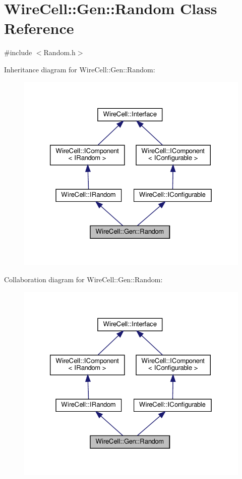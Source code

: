 \hypertarget{class_wire_cell_1_1_gen_1_1_random}{}\section{Wire\+Cell\+:\+:Gen\+:\+:Random Class Reference}
\label{class_wire_cell_1_1_gen_1_1_random}


{\ttfamily \#include $<$Random.\+h$>$}



Inheritance diagram for Wire\+Cell\+:\+:Gen\+:\+:Random\+:
\nopagebreak
\begin{figure}[H]
\begin{center}
\leavevmode
\includegraphics[width=326pt]{class_wire_cell_1_1_gen_1_1_random__inherit__graph}
\end{center}
\end{figure}


Collaboration diagram for Wire\+Cell\+:\+:Gen\+:\+:Random\+:
\nopagebreak
\begin{figure}[H]
\begin{center}
\leavevmode
\includegraphics[width=326pt]{class_wire_cell_1_1_gen_1_1_random__coll__graph}
\end{center}
\end{figure}
